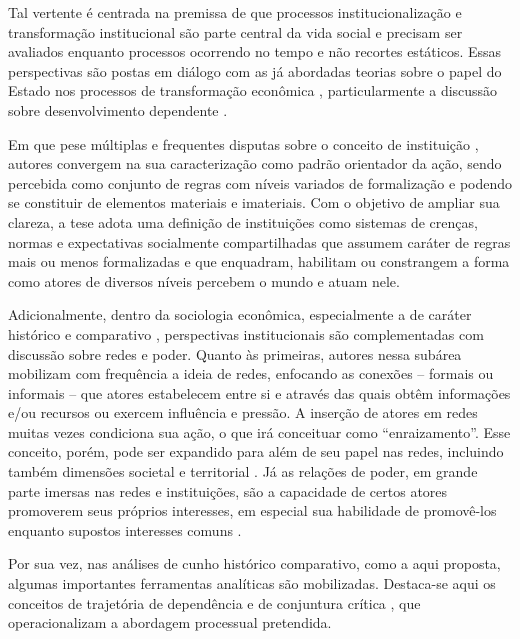 Tal vertente é centrada na premissa de que processos institucionalização
e transformação institucional são parte central da vida social e
precisam ser avaliados enquanto processos ocorrendo no tempo e não
recortes estáticos. Essas perspectivas são postas em diálogo com as já
abordadas teorias sobre o papel do Estado nos processos de transformação
econômica \citep{evans_bringing_1985}, particularmente a discussão sobre
desenvolvimento dependente
\citep{evans_dependent_1979}.

Em que pese múltiplas e frequentes disputas sobre o conceito de
instituição \citep{duina2011,morganetal2010,nee_new_2005,scott2014}, autores
convergem na sua caracterização como padrão orientador da ação, sendo
percebida como conjunto de regras com níveis variados de formalização e
podendo se constituir de elementos materiais e imateriais. Com o
objetivo de ampliar sua clareza, a tese adota uma definição de
instituições como sistemas de crenças, normas e expectativas socialmente
compartilhadas que assumem caráter de regras mais ou menos formalizadas
e que enquadram, habilitam ou constrangem a forma como atores de
diversos níveis percebem o mundo e atuam nele.

Adicionalmente, dentro da sociologia econômica, especialmente a de
caráter histórico e comparativo
\citep{dobbin_comparative_2005},
perspectivas institucionais são complementadas com discussão sobre redes
e poder. Quanto às primeiras, autores nessa subárea mobilizam com
frequência a ideia de redes, enfocando as conexões -- formais ou
informais -- que atores estabelecem entre si e através das quais obtêm
informações e/ou recursos ou exercem influência e pressão. A inserção de
atores em redes muitas vezes condiciona sua ação, o que
\citet{granovetter2007} irá conceituar
como ``enraizamento''. Esse conceito, porém, pode ser expandido para
além de seu papel nas redes, incluindo também dimensões societal e
territorial \citep{hess2004}. Já as relações de poder, em grande parte imersas nas redes e
instituições, são a capacidade de certos atores promoverem seus próprios
interesses, em especial sua habilidade de promovê-los enquanto supostos
interesses comuns
\citep{dobbin_comparative_2005}.

Por sua vez, nas análises de cunho histórico comparativo, como a aqui
proposta, algumas importantes ferramentas analíticas são mobilizadas.
Destaca-se aqui os conceitos de trajetória de dependência e de
conjuntura crítica
\citep{mahoney_path_2000,mahoney_comparative-historical_2004}, que operacionalizam a abordagem processual pretendida.

